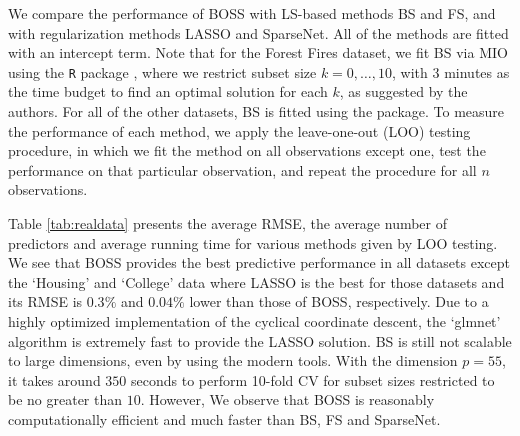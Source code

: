 We compare the performance of BOSS with LS-based methods BS and FS, and with regularization methods LASSO and SparseNet. All of the methods are fitted with an intercept term. Note that for the Forest Fires dataset, we fit BS via MIO \citep{Bertsimas2016} using the {\tt{R}} package  \citep{Hastie2017}, where we restrict subset size $k=0,\dots,10$, with $3$ minutes as the time budget to find an optimal solution for each $k$, as suggested by the authors. For all of the other datasets, BS is fitted using the  package. To measure the performance of each method, we apply the leave-one-out (LOO) testing procedure, in which we fit the method on all observations except one, test the performance on that particular observation, and repeat the procedure for all $n$ observations. 

Table \ref{tab:realdata} presents the average RMSE, the average number of predictors and average running time for various methods given by LOO testing. We see that BOSS provides the best predictive performance in all datasets except the `Housing' and `College' data where LASSO is the best for those datasets and its RMSE is $0.3\%$ and $0.04\%$ lower than those of BOSS, respectively. Due to a highly optimized implementation of the cyclical coordinate descent, the `glmnet' algorithm is extremely fast to provide the LASSO solution. BS is still not scalable to large dimensions, even by using the modern tools. With the dimension $p=55$, it takes around $350$ seconds to perform 10-fold CV for subset sizes restricted to be no greater than $10$. However, We observe that BOSS is reasonably computationally efficient and much faster than BS, FS and SparseNet. 





